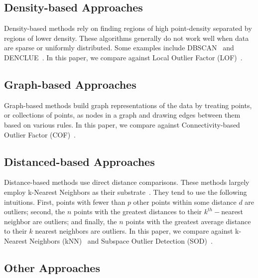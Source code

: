 \subsection{Density-based Approaches}
\label{subsec:introduction:density-based-approaches}

Density-based methods rely on finding regions of high point-density separated by regions of lower density.
These algorithms generally do not work well when data are sparse or uniformly distributed.
Some examples include
DBSCAN~\cite{ester1996density} and
DENCLUE~\cite{hinneburg1998efficient}.
In this paper, we compare against Local Outlier Factor (LOF)~\cite{breunig2000lof}.



\subsection{Graph-based Approaches}
\label{subsec:introduction:graph-based-approaches}

Graph-based methods build graph representations of the data by treating points, or collections of points, as nodes in a graph and drawing edges between them based on various rules. In this paper, we compare against Connectivity-based Outlier Factor (COF)~\cite{tang2002cof}.



\subsection{Distanced-based Approaches}
\label{subsec:related-works:distanced-based-approaches}

Distance-based methods use direct distance comparisons.
These methods largely employ k-Nearest Neighbors as their substrate~\cite{wang2019progress}.
They tend to use the following intuitions. First, points with fewer than $p$ other points within some distance $d$ are outliers; second, the $n$ points with the greatest distances to their $k^{th}-$nearest neighbor are outliers;
and finally, the $n$ points with the greatest average distance to their $k$ nearest neighbors are outliers.
In this paper, we compare against
k-Nearest Neighbors (kNN)~\cite{ramaswamy2000efficient, sridhar2000knn, fabrizio2002knn}
and Subspace Outlier Detection (SOD)~\cite{kriegel2009sod}.


\subsection{Other Approaches}
\label{subsec:introduction:other-appraoches}

